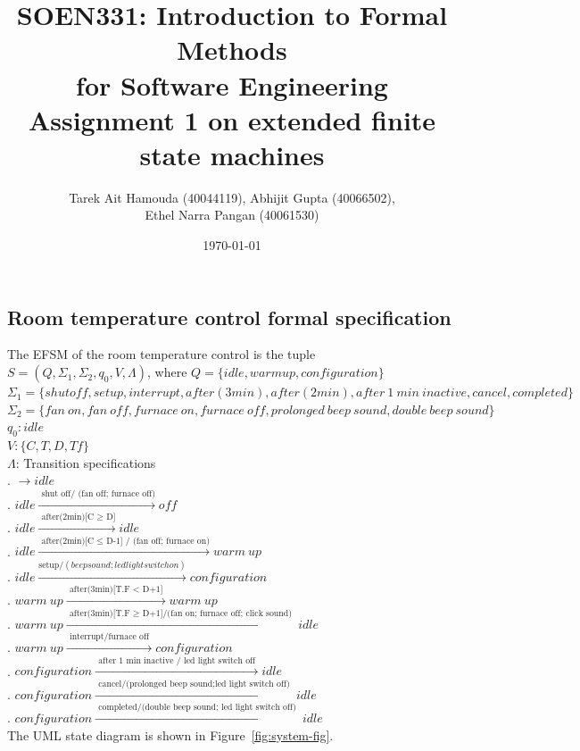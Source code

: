 \documentclass[12pt]{article}
\title{SOEN331: Introduction to Formal Methods\\for Software Engineering\\
Assignment 1 on extended finite state machines}
\author{Tarek Ait Hamouda (40044119), Abhijit Gupta (40066502),\\ 
Ethel Narra Pangan (40061530)}
\date{\today}
\begin{document}
\begin{spacing}{1.5}

\maketitle

\section{Room temperature control formal specification}

\noindent The EFSM of the room temperature control is the tuple $S = (Q, \Sigma_1, \Sigma_2, q_0, V, \Lambda)$, where
\noindent $Q = \{idle, warm up, configuration\}$\\
\noindent $\Sigma_1 = \{shut off, setup, interrupt, after(3min), after(2min), after~1~min~inactive, cancel, completed\}$\\
\noindent $\Sigma_2 = \{fan~on, fan~off, furnace~on, furnace~off, prolonged~beep~sound, double~beep~sound\}$\\
\noindent $q_0: idle$\\
\noindent $V: \{C, T, D, Tf\}$\\
\noindent $\Lambda$: Transition specifications\\
. $\rightarrow idle$\\
. $idle \xrightarrow {\text { shut off/ (fan off; furnace off)}} off$\\
. $idle \xrightarrow {\text { after(2min)[C $\geq$ D]}} idle$\\
. $idle \xrightarrow {\text { after(2min)[C $\leq$ D-1] / (fan off; furnace on)}} warm~up$\\
. $idle \xrightarrow {\text {setup}/(beep sound ; led light switch on)} configuration$\\
. $warm~up \xrightarrow {\text { after(3min)[T.F $<$ D+1] }} warm~up$\\
. $warm~up \xrightarrow {\text { after(3min)[T.F $\geq$ D+1]/(fan on; furnace off; click sound) }} idle$\\
. $warm~up \xrightarrow {\text { interrupt/furnace off }} configuration$\\
. $configuration \xrightarrow {\text { after 1 min inactive / led light switch off }} idle$\\
. $configuration \xrightarrow {\text { cancel/(prolonged beep sound;led light switch off) }} idle$\\
. $configuration \xrightarrow {\text { completed/(double beep sound; led light switch off) }} idle$\\
\noindent The UML state diagram is shown in Figure~\ref{fig:system-fig}.\\\\


\end{spacing}
\end{document}
